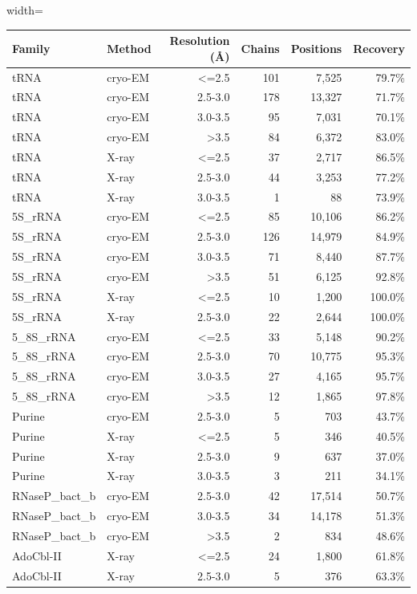 \documentclass[pdflatex,sn-nature]{sn-jnl}
\begin{document}
\begingroup\footnotesize
\begin{adjustbox}{width=\textwidth}
\begin{tabular}{llrrrr}
\toprule
Family & Method & Resolution (\AA) & Chains & Positions & Recovery \\
\midrule
tRNA & cryo-EM & <=2.5 & 101 & 7,525 & 79.7\% \\
tRNA & cryo-EM & 2.5-3.0 & 178 & 13,327 & 71.7\% \\
tRNA & cryo-EM & 3.0-3.5 & 95 & 7,031 & 70.1\% \\
tRNA & cryo-EM & >3.5 & 84 & 6,372 & 83.0\% \\
tRNA & X-ray & <=2.5 & 37 & 2,717 & 86.5\% \\
tRNA & X-ray & 2.5-3.0 & 44 & 3,253 & 77.2\% \\
tRNA & X-ray & 3.0-3.5 & 1 & 88 & 73.9\% \\
5S\_rRNA & cryo-EM & <=2.5 & 85 & 10,106 & 86.2\% \\
5S\_rRNA & cryo-EM & 2.5-3.0 & 126 & 14,979 & 84.9\% \\
5S\_rRNA & cryo-EM & 3.0-3.5 & 71 & 8,440 & 87.7\% \\
5S\_rRNA & cryo-EM & >3.5 & 51 & 6,125 & 92.8\% \\
5S\_rRNA & X-ray & <=2.5 & 10 & 1,200 & 100.0\% \\
5S\_rRNA & X-ray & 2.5-3.0 & 22 & 2,644 & 100.0\% \\
5\_8S\_rRNA & cryo-EM & <=2.5 & 33 & 5,148 & 90.2\% \\
5\_8S\_rRNA & cryo-EM & 2.5-3.0 & 70 & 10,775 & 95.3\% \\
5\_8S\_rRNA & cryo-EM & 3.0-3.5 & 27 & 4,165 & 95.7\% \\
5\_8S\_rRNA & cryo-EM & >3.5 & 12 & 1,865 & 97.8\% \\
Purine & cryo-EM & 2.5-3.0 & 5 & 703 & 43.7\% \\
Purine & X-ray & <=2.5 & 5 & 346 & 40.5\% \\
Purine & X-ray & 2.5-3.0 & 9 & 637 & 37.0\% \\
Purine & X-ray & 3.0-3.5 & 3 & 211 & 34.1\% \\
RNaseP\_bact\_b & cryo-EM & 2.5-3.0 & 42 & 17,514 & 50.7\% \\
RNaseP\_bact\_b & cryo-EM & 3.0-3.5 & 34 & 14,178 & 51.3\% \\
RNaseP\_bact\_b & cryo-EM & >3.5 & 2 & 834 & 48.6\% \\
AdoCbl-II & X-ray & <=2.5 & 24 & 1,800 & 61.8\% \\
AdoCbl-II & X-ray & 2.5-3.0 & 5 & 376 & 63.3\% \\
\bottomrule
\end{tabular}
\end{adjustbox}
\endgroup
\end{document}
